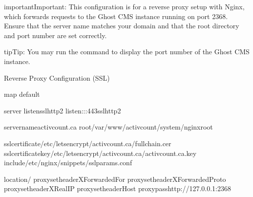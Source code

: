 \documentclass[letterpaper,10pt,english]{sphinxmanual}
\begin{document}
\begin{sphinxadmonition}{important}{Important:}
\sphinxAtStartPar
This configuration is for a reverse proxy setup with Nginx, which forwards requests to the Ghost CMS instance running on port 2368. Ensure that the server name matches your domain and that the root directory and port number are set correctly.
\end{sphinxadmonition}

\begin{sphinxadmonition}{tip}{Tip:}
\sphinxAtStartPar
You may run the command  to display the port number of the Ghost CMS instance.
\end{sphinxadmonition}

\sphinxAtStartPar
Reverse Proxy Configuration (SSL)

\begin{sphinxVerbatim}[commandchars=\\\{\}]
map
default

server
listensslhttp2
listen\PYG{o}{[}::\PYG{o}{]}:443sslhttp2

server\PYGZus{}nameactivcount.ca
root/var/www/activcount/system/nginx\PYGZhy{}root

ssl\PYGZus{}certificate/etc/letsencrypt/activcount.ca/fullchain.cer
ssl\PYGZus{}certificate\PYGZus{}key/etc/letsencrypt/activcount.ca/activcount.ca.key
include/etc/nginx/snippets/ssl\PYGZhy{}params.conf

location/
proxy\PYGZus{}set\PYGZus{}headerX\PYGZhy{}Forwarded\PYGZhy{}For
proxy\PYGZus{}set\PYGZus{}headerX\PYGZhy{}Forwarded\PYGZhy{}Proto
proxy\PYGZus{}set\PYGZus{}headerX\PYGZhy{}Real\PYGZhy{}IP
proxy\PYGZus{}set\PYGZus{}headerHost
proxy\PYGZus{}passhttp://127.0.0.1:2368


\end{sphinxVerbatim}
\end{document}
